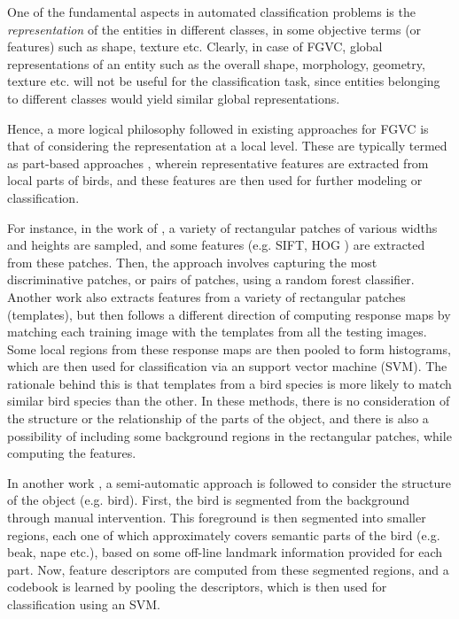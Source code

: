 \documentclass{article}
\begin{document}
One of the fundamental aspects in automated classification problems is the
\emph{representation} of the entities in different classes, in some objective
terms (or features) such as shape, texture etc. Clearly, in case of FGVC, global
representations of an entity such as the overall shape, morphology, geometry,
texture etc. will not be useful for the classification task, since entities
belonging to different classes would yield similar global representations. 

Hence, a more logical philosophy followed in existing approaches for FGVC is
that of considering the representation at a local level. These are typically
termed as part-based approaches \cite{dpm,hierarchy,poof,random,codebookfree},
wherein representative features are extracted from local parts of birds, and
these features are then used for further modeling or classification.  

For instance, in the work of \cite{random}, a variety of rectangular patches of
various widths and heights are sampled, and some features (e.g. SIFT, HOG
\cite{random,poof}) are extracted from these patches. Then, the approach
involves capturing the most discriminative patches, or pairs of patches, using a
random forest classifier. Another work \cite{codebookfree} also extracts
features from a variety of rectangular patches (templates), but then follows a
different direction of computing response maps by matching each training image
with the templates from all the testing images. Some local regions from these response
maps are then pooled to form histograms, which are then used for classification
via an support vector machine (SVM). The rationale behind this is that templates
from a bird species is more likely to match similar bird species than the other.
In these methods, there is no consideration of the structure or the relationship
of the parts of the object, and there is also a possibility of including some
background regions in the rectangular patches, while computing the features. 

In another work \cite{hierarchy}, a semi-automatic approach is followed to
consider the structure of the object (e.g. bird). First, the bird is segmented
from the background through manual intervention. This
foreground is then segmented into smaller regions, each one of which
approximately covers semantic parts of the bird (e.g. beak, nape etc.), based on
some off-line landmark information provided for each part. Now, feature
descriptors are computed from these segmented regions, and a codebook is learned
by pooling the descriptors, which is then used for classification using an SVM.
     
\end{document}
